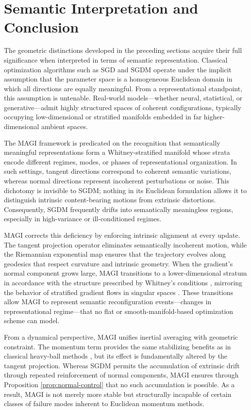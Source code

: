 \documentclass[12pt]{article}
\begin{document}
\section{Semantic Interpretation and Conclusion}

The geometric distinctions developed in the preceding sections acquire their full significance when interpreted in terms of semantic representation. Classical optimization algorithms such as SGD and SGDM operate under the implicit assumption that the parameter space is a homogeneous Euclidean domain in which all directions are equally meaningful. From a representational standpoint, this assumption is untenable. Real-world models—whether neural, statistical, or generative—admit highly structured spaces of coherent configurations, typically occupying low-dimensional or stratified manifolds embedded in far higher-dimensional ambient spaces.

The MAGI framework is predicated on the recognition that semantically meaningful representations form a Whitney-stratified manifold \citep{Whitney1965,GoreskyMacPherson1988,Pflaum2000} whose strata encode different regimes, modes, or phases of representational organization. In such settings, tangent directions correspond to coherent semantic variations, whereas normal directions represent incoherent perturbations or noise. This dichotomy is invisible to SGDM; nothing in its Euclidean formulation allows it to distinguish intrinsic content-bearing motions from extrinsic distortions. Consequently, SGDM frequently drifts into semantically meaningless regions, especially in high-variance or ill-conditioned regimes.

MAGI corrects this deficiency by enforcing intrinsic alignment at every update. The tangent projection operator \citep{doCarmoRiemannian1992,LeeRiemannian2018} eliminates semantically incoherent motion, while the Riemannian exponential map ensures that the trajectory evolves along geodesics that respect curvature and intrinsic geometry. When the gradient’s normal component grows large, MAGI transitions to a lower-dimensional stratum in accordance with the structure prescribed by Whitney’s conditions \citep{Whitney1965}, mirroring the behavior of stratified gradient flows in singular spaces \citep{GoreskyMacPherson1988}. These transitions allow MAGI to represent semantic reconfiguration events—changes in representational regime—that no flat or smooth-manifold-based optimization scheme can model.

From a dynamical perspective, MAGI unifies inertial averaging with geometric constraint. The momentum term provides the same stabilizing benefits as in classical heavy-ball methods \citep{Polyak1964,Sutskever2013}, but its effect is fundamentally altered by the tangent projection. Whereas SGDM permits the accumulation of extrinsic drift through repeated reinforcement of normal components, MAGI ensures through Proposition \ref{prop:normal-control} that no such accumulation is possible. As a result, MAGI is not merely more stable but structurally incapable of certain classes of failure modes inherent to Euclidean momentum methods.
\end{document}
